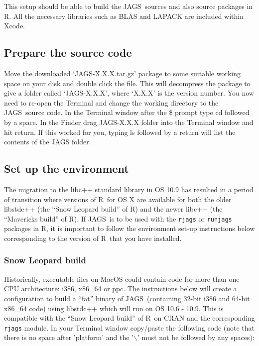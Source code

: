 \documentclass[11pt, a4paper, titlepage]{article}
\newcommand{\JAGS}{\textsf{JAGS}}
\newcommand{\R}{\textsf{R}}
\newcommand{\code}[1]{{\bgroup{\normalfont\ttfamily #1}\egroup}}
\newcommand{\file}[1]{{`\normalfont\textsf{#1}'}}
\begin{document}
This setup should be able to build the \JAGS\ sources and also source
packages in R.  All the necessary libraries such as BLAS and LAPACK are
included within Xcode.


\subsection{Prepare the source code}

Move the downloaded \file{JAGS-X.X.X.tar.gz} package to some suitable
working space on your disk and double click the file.  This will
decompress the package to give a folder called \file{JAGS-X.X.X}, where
`X.X.X' is the version number.  You now need to re-open the Terminal and
change the working directory to the \JAGS\ source code. In the Terminal
window after the \$ prompt type \code{cd} followed by a space.  In the Finder
drag JAGS-X.X.X folder into the Terminal window and hit return.  If this
worked for you, typing \code{ls} followed by a return will list the contents
of the JAGS folder.


\subsection{Set up the environment}

The migration to the libc++ standard library in OS 10.9 has resulted in
a period of transition where versions of \R\ for OS X are available for
both the older libstdc++ (the ``Snow Leopard build'' of \R) and the
newer libc++ (the ``Mavericks build'' of \R).  If \JAGS\ is to be used
with the \texttt{rjags} or \texttt{runjags} packages in \R, it is
important to follow the environment set-up instructions below
corresponding to the version of \R\ that you have installed.

\subsubsection{Snow Leopard build}

Historically, executable files on MacOS could contain code for more than
one CPU architecture: i386, x86\_64 or ppc.  The instructions below will
create a configuration to build a ``fat'' binary of \JAGS\ (containing
32-bit i386 and 64-bit x86\_64 code) using libstdc++ which will run on
OS 10.6 - 10.9.  This is compatible with the ``Snow Leopard build'' of
\R\ on CRAN and the corresponding \texttt{rjags} module. In your
Terminal window copy/paste the following code (note that there is no
space after 'platform' and the '$\backslash$' must not be followed by
any spaces): 
\end{document}
